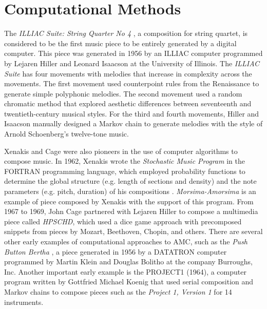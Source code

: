 \section{Computational Methods}

The \textit{ILLIAC Suite: String Quarter No 4} \cite{hiller1957musical}, a composition for string quartet, is considered to be the first music piece to be entirely generated by a digital computer. This piece was generated in 1956 by an ILLIAC computer programmed by Lejaren Hiller and Leonard Isaacson at the University of Illinois. The \textit{ILLIAC Suite} has four movements with melodies that increase in complexity across the movements. The first movement used counterpoint rules from the Renaissance to generate simple polyphonic melodies. The second movement used a random chromatic method that explored aesthetic differences between seventeenth and twentieth-century musical styles. For the third and fourth movements, Hiller and Isaacson manually designed a Markov chain to generate melodies with the style of Arnold Schoenberg's twelve-tone music.

Xenakis and Cage were also pioneers in the use of computer algorithms to compose music. In 1962, Xenakis wrote the \textit{Stochastic Music Program} in the FORTRAN programming language, which employed probability functions to determine the global structure (e.g. length of sections and density) and the note parameters (e.g. pitch, duration) of his compositions \cite{luque2009stochastic}. \textit{Morsima-Amorsima} is an example of piece composed by Xenakis with the support of this program. From 1967 to 1969, John Cage partnered with Lejaren Hiller to compose a multimedia piece called \textit{HPSCHD}, which used a dice game approach with precomposed snippets from pieces by Mozart, Beethoven, Chopin, and others. There are several other early examples of computational approaches to AMC, such as the \textit{Push Button Bertha} \cite{ames1987automated}, a piece generated in 1956 by a DATATRON computer programmed by Martin Klein and Douglas Bolitho at the company Burroughs, Inc. Another important early example is the PROJECT1 (1964), a computer program written by Gottfried Michael Koenig that used serial composition and Markov chains to compose pieces such as the \textit{Project 1, Version 1} for 14 instruments.

